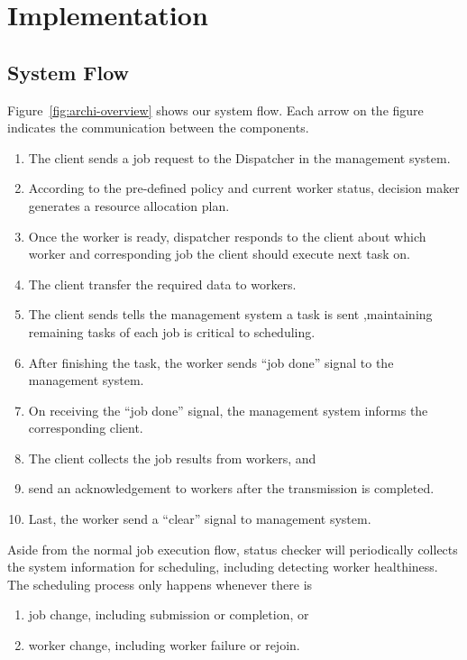 \chapter{Implementation}\label{sec:impl}  %

\section{System Flow}	%

Figure~\ref{fig:archi-overview} shows our system flow. Each arrow on the
figure indicates the communication between the components.
\begin{enumerate}
  \item The client sends a job request to the Dispatcher in the management 
    system.
  \item According to the pre-defined policy and current worker status,
    decision maker generates a resource allocation plan.
  \item Once the worker is ready, dispatcher responds to the client
    about which worker and corresponding job the client should execute
    next task on.
  \item The client transfer the required data to workers.
  \item The client sends tells the management system a task is sent
    ,maintaining remaining tasks of each job is critical to scheduling.
  \item After finishing the task, the worker sends ``job done'' signal
    to the management system.

  \item On receiving the ``job done'' signal, the management system
    informs the corresponding client.
  
  \item The client collects the job results from workers, and

  \item send an acknowledgement to workers after the transmission is
    completed.
  \item Last, the worker send a ``clear'' signal to management system.
\end{enumerate}
Aside from the normal job execution flow, status checker will
periodically collects the system information for scheduling, including
detecting worker healthiness.
The scheduling process only happens whenever there is 
\begin{enumerate}
  \item job change, including submission or completion, or
  \item worker change, including worker failure or rejoin.
\end{enumerate}

